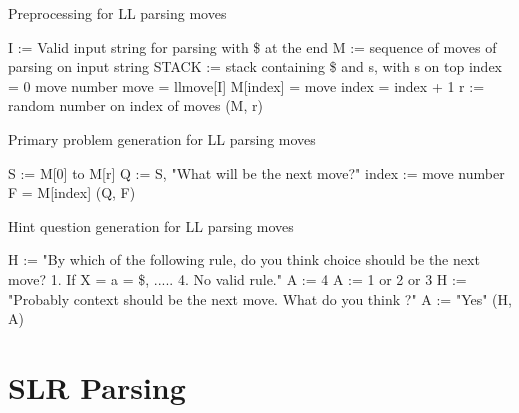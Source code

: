 \begin{algorithm}
\caption{Preprocessing for LL parsing moves}
\label{algo:preprocessing-llmoves}
\begin{algorithmic}[1]
\State I := Valid input string for parsing with \$ at the end
\State M := sequence of moves of parsing on input string
\State STACK := stack containing \$ and s, with s on top
\State index = 0    \Comment move number
\State move = llmove[I]
\State M[index] = move
\State index = index + 1
\EndWhile
\State r := random number on index of moves
\State \Return (M, r)
\EndFunction
\end{algorithmic}
\end{algorithm}

\begin{algorithm}
\caption{Primary problem generation for LL parsing moves}
\label{algo:primary-llmoves}
\begin{algorithmic}[1]
\State S := M[0] to M[r]
\State Q := S, "What will be the next move?"
\State index := move number
\State F = M[index]
\State \Return (Q, F)
\EndFunction
\end{algorithmic}
\end{algorithm}

\begin{algorithm}
\caption{Hint question generation for LL parsing moves}
\label{algo:hint-llmoves}
\begin{algorithmic}[1]
\State H := "By which of the following rule, do you think choice should be the next move? 1. If X = a = \$, ..... 4. No valid rule."
\State A := 4
\State A := 1 or 2 or 3
\EndIf
{}
\State H := "Probably context should be the next move. What do you think ?"
\State A := "Yes"
\EndIf
\State \Return (H, A)
\EndFunction
\end{algorithmic}
\end{algorithm}

\section{SLR Parsing}
\label{slrparsing}


